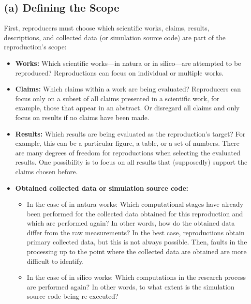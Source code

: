 \documentclass[authordate, meta]{jote-new-article}
\begin{document}
	\subsection{(a) Defining the Scope}



	First, reproducers must choose which scientific works, claims, results, descriptions, and collected data (or simulation source code) are part of the reproduction's scope:
	\begin{itemize}


		\item \textbf{Works:} Which scientific works—in natura or in silico—are attempted to be reproduced? Reproductions can focus on individual or multiple works.



		\item \textbf{Claims:} Which claims within a work are being evaluated? Reproducers can focus only on a subset of all claims presented in a scientific work, for example, those that appear in an abstract. Or disregard all claims and only focus on results if no claims have been made.



		\item \textbf{Results:} Which results are being evaluated as the reproduction's target? For example, this can be a particular figure, a table, or a set of numbers. There are many degrees of freedom for reproductions when selecting the evaluated results. One possibility is to focus on all results that (supposedly) support the claims chosen before.



		\item \textbf{Obtained collected data or simulation source code:}

		\begin{itemize}


			\item In the case of in natura works: Which computational stages have already been performed for the collected data obtained for this reproduction and which are performed again? In other words, how do the obtained data differ from the raw measurements? In the best case, reproductions obtain primary collected data, but this is not always possible. Then, faults in the processing up to the point where the collected data are obtained are more difficult to identify.



			\item In the case of in silico works: Which computations in the research process are performed again? In other words, to what extent is the simulation source code being re-executed?



\end{itemize}
\end{itemize}
\end{document}
